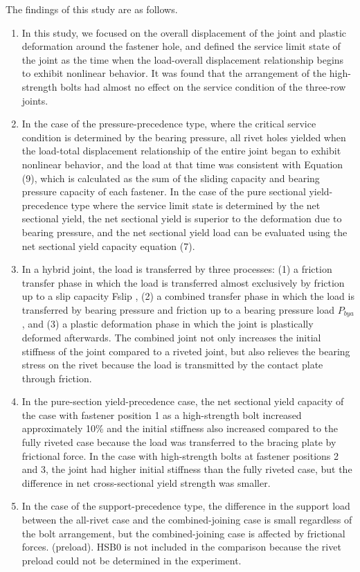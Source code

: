 The findings of this study are as follows.
\begin{enumerate}
    \item In this study, we focused on the overall displacement of the joint and plastic deformation around the fastener hole, and defined the service limit state of the joint as the time when the load-overall displacement relationship begins to exhibit nonlinear behavior. It was found that the arrangement of the high-strength bolts had almost no effect on the service condition of the three-row joints.

    \item  In the case of the pressure-precedence type, where the critical service condition is determined by the bearing pressure, all rivet holes yielded when the load-total displacement relationship of the entire joint began to exhibit nonlinear behavior, and the load at that time was consistent with Equation (9), which is calculated as the sum of the sliding capacity and bearing pressure capacity of each fastener. In the case of the pure sectional yield-precedence type where the service limit state is determined by the net sectional yield, the net sectional yield is superior to the deformation due to bearing pressure, and the net sectional yield load can be evaluated using the net sectional yield capacity equation (7).

    \item  In a hybrid joint, the load is transferred by three processes: (1) a friction transfer phase in which the load is transferred almost exclusively by friction up to a slip capacity Fslip , (2) a combined transfer phase in which the load is transferred by bearing pressure and friction up to a bearing pressure load $P_{bya}$ , and (3) a plastic deformation phase in which the joint is plastically deformed afterwards. The combined joint not only increases the initial stiffness of the joint compared to a riveted joint, but also relieves the bearing stress on the rivet because the load is transmitted by the contact plate through friction.

    \item  In the pure-section yield-precedence case, the net sectional yield capacity of the case with fastener position 1 as a high-strength bolt increased approximately 10\% and the initial stiffness also increased compared to the fully riveted case because the load was transferred to the bracing plate by frictional force. In the case with high-strength bolts at fastener positions 2 and 3, the joint had higher initial stiffness than the fully riveted case, but the difference in net cross-sectional yield strength was smaller.

    \item In the case of the support-precedence type, the difference in the support load between the all-rivet case and the combined-joining case is small regardless of the bolt arrangement, but the combined-joining case is affected by frictional forces. (preload). HSB0 is not included in the comparison because the rivet preload could not be determined in the experiment.
    
\end{enumerate}
 





